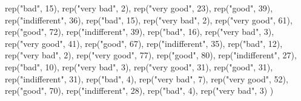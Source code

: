 \documentclass[
  letterpaper,
]{book}
\newenvironment{Shaded}{\begin{snugshade}}{\end{snugshade}}
\newcommand{\DecValTok}[1]{\textcolor[rgb]{0.68,0.00,0.00}{#1}}
\newcommand{\FunctionTok}[1]{\textcolor[rgb]{0.28,0.35,0.67}{#1}}
\newcommand{\NormalTok}[1]{\textcolor[rgb]{0.00,0.23,0.31}{#1}}
\newcommand{\StringTok}[1]{\textcolor[rgb]{0.13,0.47,0.30}{#1}}
\begin{document}
\begin{Shaded}
\begin{Highlighting}[]
  \FunctionTok{rep}\NormalTok{(}\StringTok{"bad"}\NormalTok{, }\DecValTok{15}\NormalTok{), }\FunctionTok{rep}\NormalTok{(}\StringTok{"very bad"}\NormalTok{, }\DecValTok{2}\NormalTok{), }
  \FunctionTok{rep}\NormalTok{(}\StringTok{"very good"}\NormalTok{, }\DecValTok{23}\NormalTok{), }\FunctionTok{rep}\NormalTok{(}\StringTok{"good"}\NormalTok{, }\DecValTok{39}\NormalTok{), }\FunctionTok{rep}\NormalTok{(}\StringTok{"indifferent"}\NormalTok{, }\DecValTok{36}\NormalTok{), }
  \FunctionTok{rep}\NormalTok{(}\StringTok{"bad"}\NormalTok{, }\DecValTok{15}\NormalTok{), }\FunctionTok{rep}\NormalTok{(}\StringTok{"very bad"}\NormalTok{, }\DecValTok{2}\NormalTok{), }
  \FunctionTok{rep}\NormalTok{(}\StringTok{"very good"}\NormalTok{, }\DecValTok{61}\NormalTok{), }\FunctionTok{rep}\NormalTok{(}\StringTok{"good"}\NormalTok{, }\DecValTok{72}\NormalTok{), }\FunctionTok{rep}\NormalTok{(}\StringTok{"indifferent"}\NormalTok{, }\DecValTok{39}\NormalTok{), }
  \FunctionTok{rep}\NormalTok{(}\StringTok{"bad"}\NormalTok{, }\DecValTok{16}\NormalTok{), }\FunctionTok{rep}\NormalTok{(}\StringTok{"very bad"}\NormalTok{, }\DecValTok{3}\NormalTok{), }
  \FunctionTok{rep}\NormalTok{(}\StringTok{"very good"}\NormalTok{, }\DecValTok{41}\NormalTok{), }\FunctionTok{rep}\NormalTok{(}\StringTok{"good"}\NormalTok{, }\DecValTok{67}\NormalTok{), }\FunctionTok{rep}\NormalTok{(}\StringTok{"indifferent"}\NormalTok{, }\DecValTok{35}\NormalTok{), }
  \FunctionTok{rep}\NormalTok{(}\StringTok{"bad"}\NormalTok{, }\DecValTok{12}\NormalTok{), }\FunctionTok{rep}\NormalTok{(}\StringTok{"very bad"}\NormalTok{, }\DecValTok{2}\NormalTok{), }
  \FunctionTok{rep}\NormalTok{(}\StringTok{"very good"}\NormalTok{, }\DecValTok{77}\NormalTok{), }\FunctionTok{rep}\NormalTok{(}\StringTok{"good"}\NormalTok{, }\DecValTok{80}\NormalTok{), }\FunctionTok{rep}\NormalTok{(}\StringTok{"indifferent"}\NormalTok{, }\DecValTok{27}\NormalTok{), }
  \FunctionTok{rep}\NormalTok{(}\StringTok{"bad"}\NormalTok{, }\DecValTok{10}\NormalTok{), }\FunctionTok{rep}\NormalTok{(}\StringTok{"very bad"}\NormalTok{, }\DecValTok{3}\NormalTok{), }
  \FunctionTok{rep}\NormalTok{(}\StringTok{"very good"}\NormalTok{, }\DecValTok{31}\NormalTok{), }\FunctionTok{rep}\NormalTok{(}\StringTok{"good"}\NormalTok{, }\DecValTok{31}\NormalTok{), }\FunctionTok{rep}\NormalTok{(}\StringTok{"indifferent"}\NormalTok{, }\DecValTok{31}\NormalTok{), }
  \FunctionTok{rep}\NormalTok{(}\StringTok{"bad"}\NormalTok{, }\DecValTok{4}\NormalTok{), }\FunctionTok{rep}\NormalTok{(}\StringTok{"very bad"}\NormalTok{, }\DecValTok{7}\NormalTok{), }
  \FunctionTok{rep}\NormalTok{(}\StringTok{"very good"}\NormalTok{, }\DecValTok{52}\NormalTok{), }\FunctionTok{rep}\NormalTok{(}\StringTok{"good"}\NormalTok{, }\DecValTok{70}\NormalTok{), }\FunctionTok{rep}\NormalTok{(}\StringTok{"indifferent"}\NormalTok{, }\DecValTok{28}\NormalTok{), }
  \FunctionTok{rep}\NormalTok{(}\StringTok{"bad"}\NormalTok{, }\DecValTok{4}\NormalTok{), }\FunctionTok{rep}\NormalTok{(}\StringTok{"very bad"}\NormalTok{, }\DecValTok{3}\NormalTok{)}
\NormalTok{  )}


\end{Highlighting}
\end{Shaded}
\end{document}
